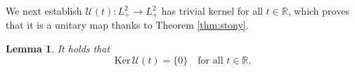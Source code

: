 \documentclass[10pt,reqno,a4paper]{amsart}
\newtheorem{lem}{Lemma}[section]
\theoremstyle{definition}
\theoremstyle{remark}
\theoremstyle{remark}
\numberwithin{equation}{section}
\newcommand{\R}{\mathbb{R}}
\newcommand{\Mean}{\mathscr{M}}
\renewcommand{\ker}{\mathrm{Ker}}
\newcommand{\be}{\begin{equation}}
\newcommand{\ee}{\end{equation}}
\newcommand{\eu}{\mathrm{e}}
\newcommand{\Ub}{\mathbf{U}}
\newcommand{\Fb}{\mathbf{F}}
\newcommand{\Gb}{\mathbf{G}}
\newcommand{\id}{I}
\newcommand{\Es}{\mathscr{E}}
\newcommand{\Us}{\mathscr{U}}
\begin{document}

We next establish $\Us(t) :L^2_+ \to L^2_+$ has trivial kernel for all $t \in \R$, which proves that it is a unitary map thanks to Theorem \ref{thm:stony}.

\begin{lem} \label{lem:Us_kernel}
It holds that
$$
\ker \, \Us(t) = \{0 \} \quad \mbox{for all $t \in \R$}.
$$
\end{lem}
\end{document}
